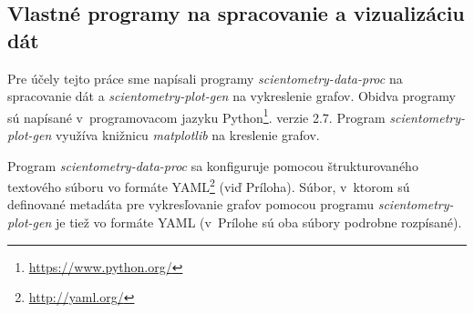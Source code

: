 \subsection{Vlastné programy na spracovanie a vizualizáciu dát}
\label{sec:program.my}

Pre účely tejto práce sme napísali programy \emph{scientometry-data-proc} na
spracovanie dát a \emph{scientometry-plot-gen} na vykreslenie grafov.  Obidva
programy sú napísané v~programovacom jazyku
Python\footnote{\url{https://www.python.org/}}. verzie 2.7.  Program
\emph{scientometry-plot-gen} využíva knižnicu \emph{matplotlib} na kreslenie
grafov.

Program \emph{scientometry-data-proc} sa konfiguruje pomocou štrukturovaného
textového súboru vo formáte YAML\footnote{\url{http://yaml.org/}} (viď
Príloha). Súbor, v~ktorom sú definované metadáta pre vykresľovanie grafov
pomocou programu \emph{scientometry-plot-gen} je tiež vo formáte YAML (v~Prílohe
sú oba súbory podrobne rozpísané).


